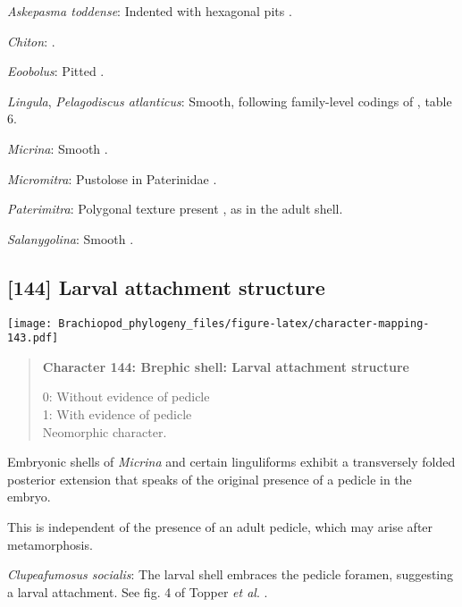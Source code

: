 \documentclass[openany]{book}
\theoremstyle{definition}
\theoremstyle{definition}
\theoremstyle{definition}
\theoremstyle{remark}
\begin{document}
\hypertarget{Askepasma_toddense-coding-143}{}
\emph{Askepasma toddense}: Indented with hexagonal pits \citep[appendix
2]{Williams1998Thediversity}.

\hypertarget{Chiton-coding-143}{}
\emph{Chiton}: \citep{Wanninger2002C}.

\hypertarget{Eoobolus-coding-143}{}
\emph{Eoobolus}: Pitted \citep[table
8]{Williams2000LinguliformeaCraniiformea}.

\hypertarget{Lingula-coding-143}{}
\emph{Lingula}, \emph{Pelagodiscus atlanticus}: Smooth, following
family-level codings of \citet{Williams2000LinguliformeaCraniiformea},
table 6.

\hypertarget{Micrina-coding-143}{}
\emph{Micrina}: Smooth \citep{Holmer2011Firstrecord}.

\hypertarget{Micromitra-coding-143}{}
\emph{Micromitra}: Pustolose in Paterinidae \citep[table
6]{Williams2000LinguliformeaCraniiformea}.

\hypertarget{Paterimitra-coding-143}{}
\emph{Paterimitra}: Polygonal texture present
\citep{Holmer2011Firstrecord}, as in the adult shell.

\hypertarget{Salanygolina-coding-143}{}
\emph{Salanygolina}: Smooth \citep{Holmer2009Theenigmatic}.

\subsection*{{[}144{]} Larval attachment
structure}\label{larval-attachment-structure}

\texttt{[image: Brachiopod\_phylogeny\_files/figure-latex/character-mapping-143.pdf]}

\begin{quote}
\textbf{Character 144: Brephic shell: Larval attachment structure}

0: Without evidence of pedicle\\
1: With evidence of pedicle\\
Neomorphic character.
\end{quote}

Embryonic shells of \emph{Micrina} and certain linguliforms exhibit a
transversely folded posterior extension that speaks of the original
presence of a pedicle in the embryo.

This is independent of the presence of an adult pedicle, which may arise
after metamorphosis.

\hypertarget{Clupeafumosus_socialis-coding-144}{}
\emph{Clupeafumosus socialis}: The larval shell embraces the pedicle
foramen, suggesting a larval attachment. See fig. 4 of Topper \emph{et
al}. \citeyearpar{Topper2013Reappraisalof}.
\end{document}

